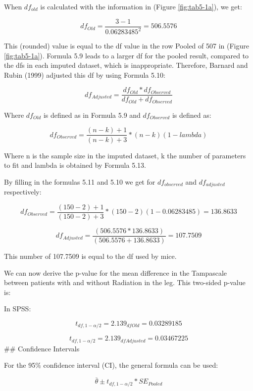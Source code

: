 \documentclass[]{book}
\theoremstyle{definition}
\theoremstyle{definition}
\theoremstyle{definition}
\theoremstyle{remark}
\begin{document}
When \(df_{old}\) is calculated with the information in (Figure
\ref{fig:tab5-1a}), we get:

\[df_{Old} = \frac{3-1}{0.06283485^2} = 506.5576\]

This (rounded) value is equal to the df value in the row Pooled of 507
in (Figure \ref{fig:tab5-1a}). Formula 5.9 leads to a larger df for the
pooled result, compared to the dfs in each imputed dataset, which is
inappropriate. Therefore, Barnard and Rubin (1999) adjusted this df by
using Formula 5.10:

\begin{equation}
df_{Adjusted} = \frac{df_{Old}*{df_{Observed}}}{df_{Old}+{df_{Observed}}}
  \label{eq:df-adj}
\end{equation}

Where \(df_{Old}\) is defined as in Formula 5.9 and \(df_{Observed}\) is
defined as:

\begin{equation}
df_{Observed} = \frac{(n-k)+1}{(n-k)+3}*(n-k)(1-lambda)
  \label{eq:df-obs}
\end{equation}

Where n is the sample size in the imputed dataset, k the number of
parameters to fit and lambda is obtained by Formula 5.13.

By filling in the formulas 5.11 and 5.10 we get for \(df_{observed}\)
and \(df_{adjusted}\) respectively:

\[df_{Observed} = \frac{(150-2)+1}{(150-2)+3}*(150-2)(1- 0.06283485)=136.8633\]

\[df_{Adjusted} = \frac{(506.5576* 136.8633)}{(506.5576+ 136.8633)}=107.7509\]

This number of 107.7509 is equal to the df used by mice.

We can now derive the p-value for the mean difference in the Tampascale
between patients with and without Radiation in the leg. This two-sided
p-value is:

In SPSS:

\[t_{df,1-\alpha/2}=2.139_{df{Old}}=0.03289185\]

\[t_{df,1-\alpha/2}=2.139_{df{Adjusted}}=0.03467225\] \#\# Confidence
Intervals

For the 95\% confidence interval (CI), the general formula can be used:

\begin{equation}
\bar{\theta} ± t_{df,1-\alpha/2} * SE_{Pooled}
  \label{eq:conf}
\end{equation}
\end{document}
